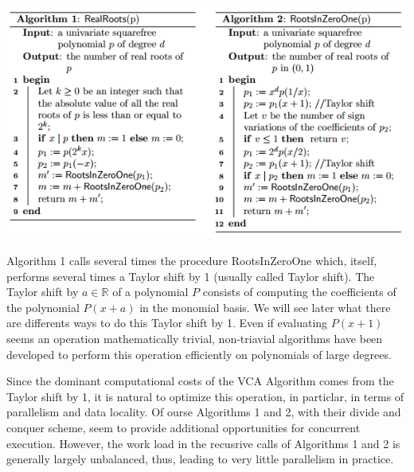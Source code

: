 \begin{center}
\includegraphics[scale=1]{VCAalgo.png}
\end{center}

Algorithm 1 calls several times the procedure RootsInZeroOne 
which, itself,  performs several times a Taylor shift by 1
(usually called Taylor shift). 
The Taylor shift by $a\in\mathbb{R}$ of a polynomial $P$ 
consists of computing the coefficients of the
polynomial $P(x+a)$ in the monomial basis.
 We will see later what there are differents ways to do this Taylor shift by 1.
Even if evaluating $P(x+1)$ seems an operation mathematically trivial,
non-triavial algorithms have been developed to perform
this operation efficiently on polynomials of large degrees.

Since the dominant computational costs of the VCA Algorithm
comes from the Taylor shift by 1, it is natural
to optimize this operation, in particlar, in terms
of parallelism and data locality.
Of ourse Algorithms 1 and 2, with their divide and conquer 
scheme, seem to provide additional opportunities
for concurrent execution.
However, the work load in the recusrive calls of Algorithms 1 and 2
is generally largely unbalanced, thus, leading to very little
parallelism in practice.
